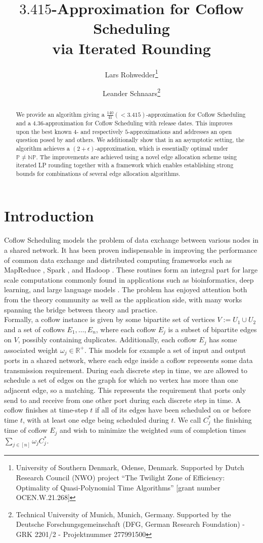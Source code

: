 \documentclass[11pt]{article}
\title{$3.415$-Approximation for Coflow Scheduling \\ via Iterated Rounding}
\author{Lars Rohwedder\thanks{University of Southern Denmark, Odense, Denmark. Supported by Dutch Research Council (NWO) project “The Twilight Zone of Efficiency: Optimality of Quasi-Polynomial Time Algorithms”
[grant number OCEN.W.21.268]} \and Leander Schnaars\thanks{Technical University of Munich, Munich, Germany. Supported by the Deutsche Forschungsgemeinschaft (DFG, German Research Foundation) - GRK 2201/2 - Projektnummer 277991500}}
\date{}
\begin{document}
\maketitle

\begin{abstract}
\noindent We provide an algorithm giving a $\frac{140}{41} (<3.415)$-approximation for Coflow Scheduling and a $4.36$-approximation for Coflow Scheduling with release dates. This improves upon the best known $4$- and respectively $5$-approximations and addresses an open question posed by \cite{agarwal_sincronia_2018, fukunaga22} and others. We additionally show that in an asymptotic setting, the algorithm achieves a $(2+\epsilon)$-approximation, which is essentially optimal under $\mathbb{P} \neq \mathbb{NP}$. The improvements are achieved using a novel edge allocation scheme using iterated LP rounding together with a framework which enables establishing strong bounds for combinations of several edge allocation algorithms.
\end{abstract}

\section{Introduction}
Coflow Scheduling models the problem of data exchange between various nodes in a shared network. It has been proven indispensable in improving the performance of common data exchange and distributed computing frameworks such as MapReduce \cite{Dean2008}, Spark \cite{Spark2010}, and Hadoop \cite{Hadoop2010}. These routines form an integral part for large scale computations commonly found in applications such as  bioinformatics, deep learning, and large language models \cite{Guo2018,Mostafaeipour2020,Gupta2017}. The problem has enjoyed attention both from the theory community as well as the application side, with many works spanning the bridge between theory and practice.\\

Formally, a coflow instance is given by some bipartite set of vertices $V := U_1 \cup U_2$ and a set of coflows $E_1,\dotsc,E_n$, where each coflow $E_j$ is a subset of bipartite edges on $V$, possibly containing duplicates. Additionally, each coflow $E_j$ has some associated weight $\omega_j \in \mathbb{R}^+$. This models for example a set of input and output ports in a shared network, where each edge inside a coflow represents some data transmission requirement. During each discrete step in time, we are allowed to schedule a set of edges on the graph for which no vertex has more than one adjacent edge, so a matching. This represents the requirement that ports only send to and receive from one other port during each discrete step in time. A coflow finishes at time-step $t$ if all of its edges have been scheduled on or before time $t$, with at least one edge being scheduled during $t$. We call $C^*_j$ the finishing time of coflow $E_j$ and wish to minimize the weighted sum of completion times $\sum_{j \in [n]}\omega_j C^*_j$.\\
\end{document}
